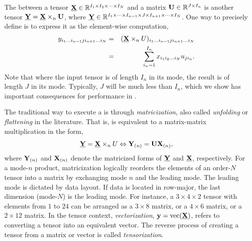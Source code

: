 The \TTM between a tensor $\T{X} \in \R^{I_1 \times I_2 \times \cdots \times I_N}$ and a matrix $\M{U} \in \R^{J \times I_n}$ is another tensor $\T{Y} = \T{X} \times_n \M{U}$, where $\T{Y} \in \R^{I_1 \times \dots \times I_{n-1} \times J \times I_{n+1} \times \cdots \times I_N}$.
One way to precisely define \TTM is to express it as the element-wise computation,
\begin{eqnarray}
  y_{i_1 \dots i_{n-1} j i_{n+1} \dots i_N}
    & = & (\T{X} \times_n U)_{i_1 \dots i_{n-1} j i_{n+1} \dots i_N} \nonumber \\
    & = & \sum_{i_n=1}^{I_n} x_{i_1 i_2 \dots i_N} u_{ji_n}.
  \label{eq:moden-ele}
\end{eqnarray}
Note that where the input tensor  is of length $I_n$ in its  mode, the result  is of length $J$ in its  mode.
Typically, $J$ will be much less than $I_n$, which we show has important consequences for performance in .


The traditional way to execute a \TTM is through \emph{matricization}, also called \emph{unfolding} or \emph{flattening} in the literature.
That is, \TTM is equivalent to a matrix-matrix multiplication in the form,
%
\begin{equation}\label{eq:moden-mat}
  \T{Y} = \T{X} \times_n U \Leftrightarrow \M{Y}_{(n)} = \M{U} \M{X}_{(n)},
\end{equation}
%
where $\M{Y}_{(n)}$ and $\M{X}_{(n)}$ denote the matricized forms of $\T{Y}$ and $\T{X}$, respectively.
For a mode-$n$ product, matricization logically reorders the elements of an order-$N$ tensor into a matrix by exchanging mode $n$ and the leading mode.
The leading mode is dictated by data layout. If data is located in row-major, the last dimension (mode-$N$) is the leading mode.
For instance, a $3 \times 4 \times 2$ tensor with elements from $1$ to $24$ can be arranged as a $3 \times 8$ matrix, or a $4 \times 6$ matrix, or a $2 \times 12$ matrix.
In the tensor context, \emph{vectorization}, $\V{y} = \makeVec(\T{X})$, refers to converting a tensor into an equivalent vector.
The reverse process of creating a tensor from a matrix or vector is called \emph{tensorization}.

